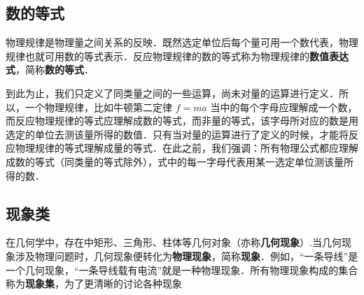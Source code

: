 
\subsection{数的等式}
物理规律是物理量之间关系的反映．既然选定单位后每个量可用一个数代表，物理规律也就可用数的等式表示．反应物理规律的数的等式称为物理规律的\textbf{数值表达式}，简称\textbf{数的等式}．

到此为止，我们只定义了同类量之间的一些运算，尚未对量的运算进行定义．所以，一个物理规律，比如牛顿第二定律 $f=ma$ 当中的每个字母应理解成一个数，而反应物理规律的等式应理解成数的等式，而非量的等式，该字母所对应的数是用选定的单位去测该量所得的数值．只有当对量的运算进行了定义的时候，才能将反应物理规律的等式理解成量的等式．在此之前，我们强调：所有物理公式都应理解成数的等式（同类量的等式除外），式中的每一字母代表用某一选定单位测该量所得的数．
\subsection{现象类}
在几何学中，存在中矩形、三角形、柱体等几何对象（亦称\textbf{几何现象}）.当几何现象涉及物理问题时，几何现象便转化为\textbf{物理现象}，简称\textbf{现象}．例如，“一条导线”是一个几何现象，“一条导线载有电流”就是一种物理现象．所有物理现象构成的集合称为\textbf{现象集}，为了更清晰的讨论各种现象